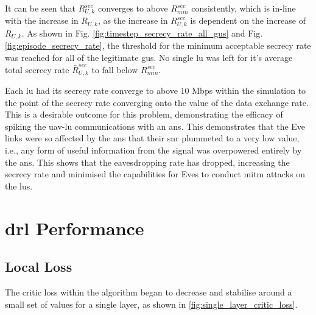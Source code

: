 It can be seen that $R_{U, k}^{sec}$ converges to above $R_{min}^{sec}$ consistently, which is in-line with the increase in $R_{U, k}$, as the increase in $R_{U, k}^{sec}$ is dependent on the increase of $R_{U, k}$.
As shown in Fig. \ref{fig:timestep_secrecy_rate_all_gus} and Fig. \ref{fig:episode_secrecy_rate}, the threshold for the minimum acceptable secrecy rate was reached for all of the legitimate \acrshort{gu}s. 
No single \acrshort{lu} was left for it's average total secrecy rate $\bar{R}_{U, k}^{sec}$ to fall below $R_{min}^{sec}$. 

Each \acrshort{lu} had its secrecy rate converge to above 10 Mbps within the simulation to the point of the secrecy rate converging onto the value of the data exchange rate. 
This is a desirable outcome for this problem, demonstrating the efficacy of spiking the \acrshort{uav}-\acrshort{lu} communications with an \acrshort{ans}. 
This demonstrates that the Eve links were so affected by the \acrshort{ans} that their \acrshort{snr} plummeted to a very low value, i.e., any form of useful information from the signal was overpowered entirely by the \acrshort{ans}. 
This shows that the eavesdropping rate has dropped, increasing the secrecy rate and minimised the capabilities for Eves to conduct \acrshort{mitm} attacks on the \acrshort{lu}s. 
\section{\texorpdfstring{\acrshort{drl}}{DRL} Performance}
\subsection{Local Loss}
The critic loss within the algorithm began to decrease and stabilise around a small set of values for a single layer, as shown in \ref{fig:single_layer_critic_loss}. 

